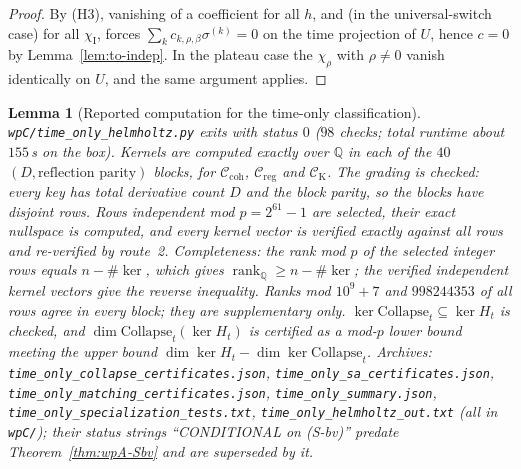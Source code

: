 \documentclass{article}
\newtheorem{lemma}[proposition]{Lemma}
\theoremstyle{remark}
\newcommand{\chiI}{\chi_{\mathrm I}}
\newcommand{\Ccoh}{\mathcal C_{\mathrm{coh}}}
\newcommand{\Creg}{\mathcal C_{\mathrm{reg}}}
\newcommand{\Coll}{\mathrm{Collapse}}
\begin{document}
\begin{proof}
By (H3), vanishing of a coefficient for all $h$, and (in the universal-switch case) for all $\chiI$, forces $\sum_kc_{k,\rho,\beta}\sigma^{(k)}=0$ on the time projection of $U$, hence $c=0$ by Lemma~\ref{lem:to-indep}.
In the plateau case the $\chi_\rho$ with $\rho\ne0$ vanish identically on $U$, and the same argument applies.
\end{proof}

\begin{lemma}[Reported computation for the time-only classification]
\label{lem:to-comp}
\texttt{wpC/time\_only\_helmholtz.py} exits with status $0$ ($98$ checks; total runtime about $155$\,s on the box).
Kernels are computed exactly over $\mathbb Q$ in each of the $40$ $(D,\text{reflection parity})$ blocks, for $\Ccoh$, $\Creg$ and $\mathcal C_{\mathrm K}$.
The grading is checked: every key has total derivative count $D$ and the block parity, so the blocks have disjoint rows.
Rows independent mod $p=2^{61}-1$ are selected, their exact nullspace is computed, and every kernel vector is verified exactly against \emph{all} rows and re-verified by route~2.
\emph{Completeness:} the rank mod $p$ of the selected integer rows equals $n-\#\ker$, which gives $\operatorname{rank}_{\mathbb Q}\ge n-\#\ker$; the verified independent kernel vectors give the reverse inequality.
Ranks mod $10^9+7$ and $998244353$ of all rows agree in every block; they are supplementary only.
$\ker\Coll_t\subseteq\ker H_t$ is checked, and $\dim\Coll_t(\ker H_t)$ is certified as a mod-$p$ lower bound meeting the upper bound $\dim\ker H_t-\dim\ker\Coll_t$.
Archives: \texttt{time\_only\_collapse\_certificates.json}, \texttt{time\_only\_sa\_certificates.json}, \texttt{time\_only\_matching\_certificates.json}, \texttt{time\_only\_summary.json}, \texttt{time\_only\_specialization\_tests.txt}, \texttt{time\_only\_helmholtz\_out.txt} (all in \texttt{wpC/}); their status strings ``CONDITIONAL on (S-bv)'' predate Theorem~\ref{thm:wpA-Sbv} and are superseded by it.
\end{lemma}
\end{document}
